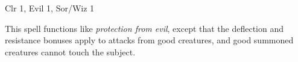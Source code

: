 
\begin{description*}
\item[Level:] Clr 1, Evil 1, Sor/Wiz 1
\end{description*}

This spell functions like \textit{protection from evil}, except that the deflection
and resistance bonuses apply to attacks from good creatures, and good summoned
creatures cannot touch the subject.